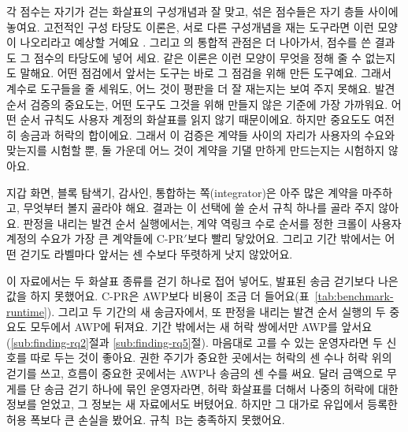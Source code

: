 
각 점수는 자기가 걷는 화살표의 구성개념과 잘 맞고, 섞은 점수들은 자기 층들 사이에 놓여요. 고전적인 구성 타당도 이론은, 서로 다른 구성개념을 재는 도구라면 이런 모양이 나오리라고 예상할 거예요 \parencite{cronbach1955construct}. 그리고 \textcite{messick1995validity}의 통합적 관점은 더 나아가서, 점수를 쓴 결과도 그 점수의 타당도에 넣어 세요. 같은 이론은 이런 모양이 무엇을 정해 줄 수 없는지도 말해요. 어떤 점검에서 앞서는 도구는 바로 그 점검을 위해 만든 도구예요. 그래서 계수로 도구들을 줄 세워도, 어느 것이 평판을 더 잘 재는지는 보여 주지 못해요. 발견 순서 검증의 중요도는, 어떤 도구도 그것을 위해 만들지 않은 기준에 가장 가까워요. 어떤 순서 규칙도 사용자 계정의 화살표를 읽지 않기 때문이에요. 하지만 중요도도 여전히 송금과 허락의 합이에요. 그래서 이 검증은 계약들 사이의 자리가 사용자의 수요와 맞는지를 시험할 뿐, 둘 가운데 어느 것이 계약을 기댈 만하게 만드는지는 시험하지 않아요.


지갑 화면, 블록 탐색기, 감사인, 통합하는 쪽(integrator)은 아주 많은 계약을 마주하고, 무엇부터 볼지 골라야 해요. 결과는 이 선택에 쓸 순서 규칙 하나를 골라 주지 않아요. 판정을 내리는 발견 순서 실행에서는, 계약 역링크 수로 순서를 정한 크롤이 사용자 계정의 수요가 가장 큰 계약들에 \mbox{C-PR}$'$보다 빨리 닿았어요. 그리고 기간 밖에서는 어떤 걷기도 라벨마다 앞서는 센 수보다 뚜렷하게 낫지 않았어요.


이 자료에서는 두 화살표 종류를 걷기 하나로 접어 넣어도, 발표된 송금 걷기보다 나은 값을 하지 못했어요. \mbox{C-PR}은 AWP보다 비용이 조금 더 들어요(표~\ref{tab:benchmark-runtime}). 그리고 두 기간의 새 송금자에서, 또 판정을 내리는 발견 순서 실행의 두 중요도 모두에서 AWP에 뒤져요. 기간 밖에서는 새 허락 쌍에서만 AWP를 앞서요(\ref{sub:finding-rq2}절과 \ref{sub:finding-rq5}절). 마음대로 고를 수 있는 운영자라면 두 신호를 따로 두는 것이 좋아요. 권한 주기가 중요한 곳에서는 허락의 센 수나 허락 위의 걷기를 쓰고, 흐름이 중요한 곳에서는 AWP나 송금의 센 수를 써요. 달러 금액으로 무게를 단 송금 걷기 하나에 묶인 운영자라면, 허락 화살표를 더해서 나중의 허락에 대한 정보를 얻었고, 그 정보는 새 자료에서도 버텼어요. 하지만 그 대가로 유입에서 등록한 허용 폭보다 큰 손실을 봤어요. 규칙~B는 충족하지 못했어요.


